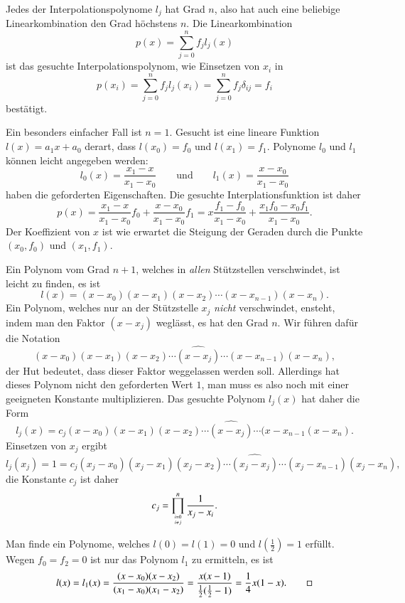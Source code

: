 Jedes der Interpolationspolynome $l_j$ hat Grad $n$, also hat auch eine
beliebige Linearkombination den Grad höchstens $n$.
%
Die Linearkombination
\[
p(x) = \sum_{j=0}^n f_j l_j(x)
\]
ist das gesuchte Interpolationspolynom, wie Einsetzen von $x_i$ in
\[
p(x_i)
=
\sum_{j=0}^n f_jl_j(x_i)
=
\sum_{j=0}^n f_j\delta_{ij}
=
f_i
\]
bestätigt.

\begin{beispiel}
Ein besonders einfacher Fall ist $n=1$.
Gesucht ist eine lineare Funktion $l(x)=a_1x+a_0$ derart, dass
$l(x_0)=f_0$ und $l(x_1)=f_1$.
Polynome $l_0$ und $l_1$ können leicht angegeben werden:
\[
l_0(x) = \frac{x_1-x}{x_1-x_0}
\qquad\text{und}\qquad
l_1(x) = \frac{x-x_0}{x_1-x_0}
\]
haben die geforderten Eigenschaften.
Die gesuchte Interplationsfunktion ist daher
\[
p(x)
=
\frac{x_1-x}{x_1-x_0}f_0 + \frac{x-x_0}{x_1-x_0} f_1
=
x \frac{f_1-f_0}{x_1-x_0}   + \frac{x_1f_0-x_0f_1}{x_1-x_0}.
\]
Der Koeffizient von $x$ ist wie erwartet die Steigung der Geraden durch
die Punkte $(x_0,f_0)$ und $(x_1,f_1)$.
\end{beispiel}

Ein Polynom vom Grad $n+1$, welches in {\em allen} Stützstellen verschwindet,
ist leicht zu finden, es ist 
\[
l(x)
=
(x-x_0)(x-x_1)(x-x_2)\cdots (x-x_{n-1})(x-x_n).
\]
%
Ein Polynom, welches nur an der Stützstelle $x_j$ {\em nicht} verschwindet,
ensteht, indem man den Faktor $(x-x_j)$ weglässt, es hat den Grad $n$.
Wir führen dafür die Notation
\[
(x-x_0)(x-x_1)(x-x_2)\cdots \widehat{(x-x_j)}\cdots (x-x_{n-1})(x-x_n),
\]
der Hut bedeutet, dass dieser Faktor weggelassen werden soll.
Allerdings hat dieses Polynom nicht den geforderten Wert $1$, man muss es
also noch mit einer geeigneten Konstante multiplizieren.
Das gesuchte Polynom $l_j(x)$ hat daher die Form
\[
l_j(x)
=
c_j(x-x_0)(x-x_1)(x-x_2)\cdots \widehat{(x-x_j)}\cdots (x-x_{n-1}(x-x_n).
\]
Einsetzen von $x_j$ ergibt
\[
l_j(x_j) = 1 = 
c_j(x_j-x_0)(x_j-x_1)(x_j-x_2)\cdots \widehat{(x_j-x_j)}\cdots(x_j-x_{n-1})(x_j-x_n),
\]
%
die Konstante $c_j$ ist daher
\[
c_j = \prod_{i=0\atop i\ne j}^n \frac{1}{x_j-x_i}.
\]

\begin{beispiel}
Man finde ein Polynome, welches $l(0)=l(1)=0$ und $l(\frac12)=1$
erfüllt.
Wegen $f_0=f_2=0$ ist nur das Polynom $l_1$ zu ermitteln, es ist
\[
l(x) = l_1(x)
=
\frac{(x-x_0)(x-x_2)}{(x_1-x_0)(x_1-x_2)}
=
\frac{x(x-1)}{\frac12(\frac12-1)}
=
\frac14x(1-x).
\qedhere
\]
\end{beispiel}

